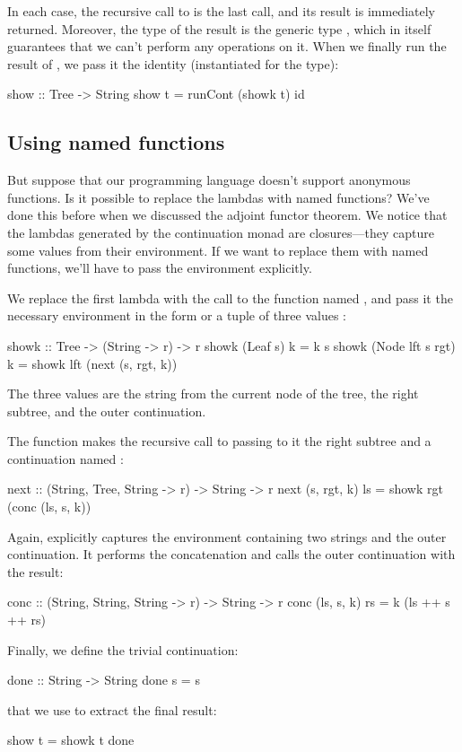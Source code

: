 \documentclass[DaoFP]{subfiles}
\begin{document}
In each case, the recursive call to  is the last call, and its result is immediately returned. Moreover, the type of the result is the generic type , which in itself guarantees that we can't perform any operations on it. When we finally run the result of , we pass it the identity (instantiated for the  type):
\begin{haskell}
show :: Tree -> String
show t = runCont (showk t) id
\end{haskell}

\subsection{Using named functions}

But suppose that our programming language doesn't support anonymous functions. Is it possible to replace the lambdas with named functions? We've done this before when we discussed the adjoint functor theorem. We notice that the lambdas generated by the continuation monad are closures---they capture some values from their environment. If we want to replace them with named functions, we'll have to pass the environment explicitly. 

We replace the first lambda with the call to the function named , and pass it the necessary environment in the form or a tuple of three values :
\begin{haskell}
showk :: Tree -> (String -> r) -> r
showk (Leaf s) k = k s
showk (Node lft s rgt) k =
  showk lft (next (s, rgt, k))
\end{haskell}
The three values are the string from the current node of the tree, the right subtree, and the outer continuation. 

The function  makes the recursive call to  passing to it the right subtree and a continuation named :
\begin{haskell}
next :: (String, Tree, String -> r) -> String -> r
next (s, rgt, k) ls = showk rgt (conc (ls, s, k))
\end{haskell}
Again,  explicitly captures the environment containing two strings and the outer continuation. It performs the concatenation and calls the outer continuation with the result:
\begin{haskell}
conc :: (String, String, String -> r) -> String -> r
conc (ls, s, k) rs = k (ls ++ s ++ rs)
\end{haskell}
Finally, we define the trivial continuation:
\begin{haskell}
done :: String -> String
done s = s
\end{haskell}
that we use to extract the final result:
\begin{haskell}
show t = showk t done
\end{haskell}
\end{document}
